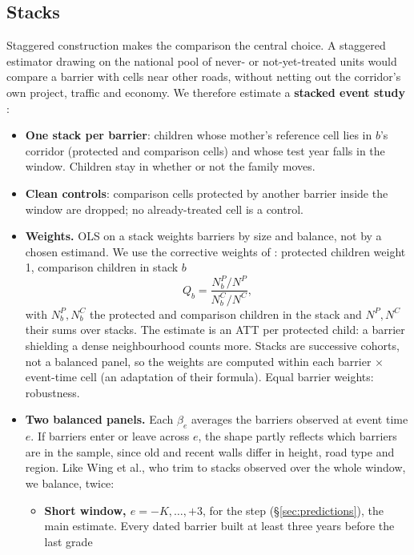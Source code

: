 \documentclass[11pt]{article}
\begin{document}
\subsection{Stacks}\label{sec:stacks}

Staggered construction makes the comparison the central choice. A staggered estimator drawing
on the national pool of never- or not-yet-treated units \autocite[as in the school-level
analysis,][]{callawayDifferenceinDifferencesMultipleTime2021} would compare a barrier with cells
near other roads, without netting out the corridor's own project, traffic and economy. We
therefore estimate a \textbf{stacked event study} \autocite{cengizEffectMinimumWages2019}:
\begin{itemize}
\item \textbf{One stack per barrier}: children whose mother's reference cell lies in \(b\)'s
  corridor (protected and comparison cells) and whose test year falls in the window. Children
  stay in whether or not the family moves.
\item \textbf{Clean controls}: comparison cells protected by another barrier inside the window
  are dropped; no already-treated cell is a control.
\item \textbf{Weights.} OLS on a stack weights barriers by size and balance, not by a chosen
  estimand. We use the corrective weights of \textcite{wingStackedDifferenceinDifferences2024}:
  protected children weight 1, comparison children in stack \(b\)
  \[ Q_b = \frac{N^P_b / N^P}{N^C_b / N^C}, \]
  with \(N^P_b, N^C_b\) the protected and comparison children in the stack and \(N^P, N^C\)
  their sums over stacks. The estimate is an ATT per protected child: a barrier shielding a
  dense neighbourhood counts more. Stacks are successive cohorts, not a balanced panel, so the
  weights are computed within each barrier \(\times\) event-time cell (an adaptation of their
  formula). Equal barrier weights: robustness.
\item \textbf{Two balanced panels.} Each \(\beta_e\) averages the barriers observed at event
  time \(e\). If barriers enter or leave across \(e\), the shape partly reflects which barriers
  are in the sample, since old and recent walls differ in height, road type and region. Like
  Wing et al., who trim to stacks observed over the whole window, we balance, twice:
  \begin{itemize}
  \item \textbf{Short window, \(e = -K, \dots, +3\)}, for the step (\S\ref{sec:predictions}),
    the main estimate. Every dated barrier built at least three years before the last grade

\end{itemize}
\end{itemize}
\end{document}
